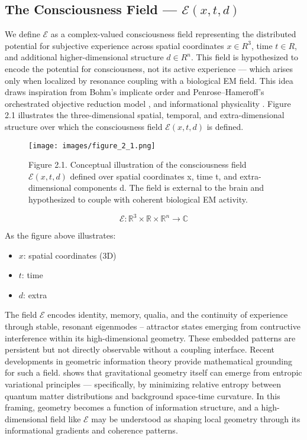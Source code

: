\documentclass[titlepage]{article}
\begin{document}
\subsection{The Consciousness Field — $\mathcal{E}(x,t,d)$}
We define $\mathcal{E}$ as a complex-valued consciousness field representing the distributed potential for subjective experience across spatial coordinates $x \in R^3$, time $t \in R$, and additional higher-dimensional structure $d \in R^n$. This field is hypothesized to encode the potential for consciousness, not its active experience — which arises only when localized by resonance coupling with a biological EM field. This idea draws inspiration from Bohm’s implicate order \parencite{bohm1980wholeness} and Penrose–Hameroff’s orchestrated objective reduction model \parencite{penrose1996orchestrated}, and informational physicality \parencite{landauer1991information}. Figure 2.1 illustrates the three-dimensional spatial, temporal, and extra-dimensional structure over which the consciousness field $\mathcal{E}(x,t,d)$ is defined.

\begin{figure}
\centering
\texttt{[image: images/figure\_2\_1.png]}
\caption{Figure 2.1. Conceptual illustration of the consciousness field $\mathcal{E}(x,t,d)$ defined over spatial coordinates x, time t, and extra-dimensional components d. The field is external to the brain and hypothesized to couple with coherent biological EM activity.}
\end{figure}

\begin{equation}
\mathcal{E} : \mathbb{R}^3 \times \mathbb{R} \times \mathbb{R}^n \rightarrow \mathbb{C}
\end{equation}

\noindent As the figure above illustrates:

\begin{itemize}
\item $x$: spatial coordinates (3D)
\item $t$: time
\item $d$: extra
\end{itemize}

The field $\mathcal{E}$ encodes identity, memory, qualia, and the continuity of experience through stable, resonant eigenmodes -- attractor states emerging from contructive interference within its high-dimensional geometry. These embedded patterns are persistent but not directly observable without a coupling interface. Recent developments in geometric information theory provide mathematical grounding for such a field. \textcite{Bianconi2025Gravity} shows that gravitational geometry itself can emerge from entropic variational principles — specifically, by minimizing relative entropy between quantum matter distributions and background space-time curvature. In this framing, geometry becomes a function of information structure, and a high-dimensional field like $\mathcal{E}$ may be understood as shaping local geometry through its informational gradients and coherence patterns.

\newpage
\printbibliography
\end{document}

